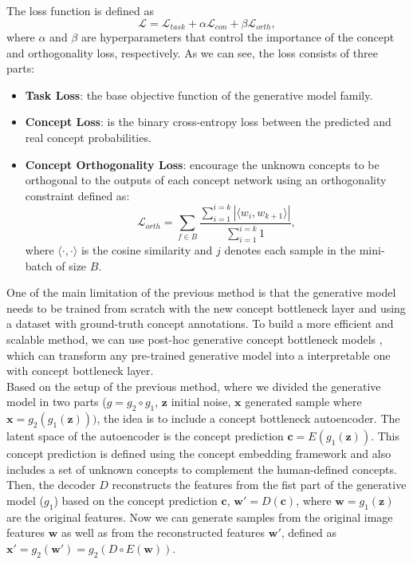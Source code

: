 The loss function is defined as $$\mathcal{L} = \mathcal{L}_{task} + \alpha\mathcal{L}_{con} + \beta\mathcal{L}_{orth},$$ where $\alpha$ and 
$\beta$ are hyperparameters that control the importance of the concept and orthogonality loss, respectively. As we can see, the loss consists 
of three parts: 
\begin{itemize}
    \item \textbf{Task Loss}: the base objective function of the generative model family. 
    \item \textbf{Concept Loss}: is the binary cross-entropy loss between the predicted and real concept probabilities. 
    \item \textbf{Concept Orthogonality Loss}: encourage the unknown concepts to be orthogonal to the outputs of each concept network using an orthogonality constraint defined as: $$\mathcal{L}_{orth} = \sum_{f\in B}\frac{\sum_{i=1}^{i=k}|\langle w_i, w_{k+1} \rangle|}{\sum_{i=1}^{i=k}1},$$ where $\langle \cdot, \cdot \rangle$ is the cosine similarity and $j$ denotes each sample in the mini-batch of size $B$. 
\end{itemize} 
One of the main limitation of the previous method is that the generative model needs to be trained from scratch with the new concept bottleneck 
layer and using a dataset with ground-truth concept annotations. To build a more efficient and scalable method, we can use post-hoc generative 
concept bottleneck models \cite{kulkarni2025interpretablegenerativemodelsposthoc}, which can transform any pre-trained generative model into a 
interpretable one with concept bottleneck layer.  \\
Based on the setup of the previous method, where we divided the generative model in two parts ($g = g_2 \circ g_1$, $\mathbf{z}$ initial noise, 
$\mathbf{x}$ generated sample where $\mathbf{x} = g_2(g_1(\mathbf{z})))$, the idea is to include a concept bottleneck autoencoder. The latent 
space of the autoencoder is the concept prediction $\mathbf{c} = E(g_1(\mathbf{z}))$. This concept prediction is defined using the concept embedding 
framework and also includes a set of unknown concepts to complement the human-defined concepts. Then, the decoder $D$ reconstructs the features from 
the fist part of the generative model ($g_1$) based on the concept prediction $\mathbf{c}$, $\mathbf{w'}=D(\mathbf{c})$, where $\mathbf{w}=g_1(\mathbf{z})$
are the original features. Now we can generate samples from the original image features $\mathbf{w}$ as well as from the reconstructed features $\mathbf{w'}$, 
defined as $\mathbf{x}' = g_2(\mathbf{w'}) = g_2(D \circ E(\mathbf{w}))$.
